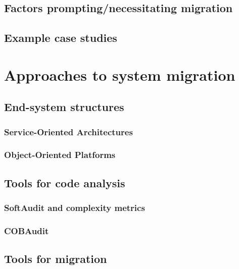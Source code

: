 \documentclass[12pt,journal,compsoc]{IEEEtran}
\begin{document}
\subsection{Factors prompting/necessitating migration}
\label{subsec:factors}

\subsection{Example case studies}
\label{subsec:examples}

\section{Approaches to system migration}
\label{sec:approaches}

\subsection{End-system structures}
\label{subsec:structures}

\subsubsection{Service-Oriented Architectures}
\label{subsubsec:soa}

\subsubsection{Object-Oriented Platforms}
\label{subsubsec:oop}

\subsection{Tools for code analysis}
\label{subsec:toolsanalysis}

\subsubsection{SoftAudit and complexity metrics}
\label{subsubsec:softaudit}

\subsubsection{COBAudit}
\label{subsubsec:cobaudit}

\subsection{Tools for migration}
\label{subsec:toolsmigration}
\end{document}
